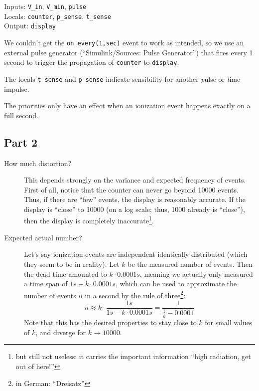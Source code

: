 \documentclass[a4paper,parskip,headheight=38pt]{scrartcl} %
\begin{document}
Inputs: \texttt{V\_in}, \texttt{V\_min}, \texttt{pulse} \\
Locals: \texttt{counter}, \texttt{p\_sense}, \texttt{t\_sense} \\
Output: \texttt{display}

We couldn't get the \texttt{on every(1,sec)} event to work as intended,
so we use an external pulse generator (\enquote{Simulink/Sources: Pulse
Generator}) that fires every 1 second to trigger the propagation of
\texttt{counter} to \texttt{display}.

The locals \texttt{t\_sense} and \texttt{p\_sense} indicate  sensibility for
another \emph{p}ulse or \emph{t}ime impulse.

The priorities only have an effect when an ionization event
happens exactly on a full second.

 \pagebreak{}
\subsection*{Part 2}

\begin{description}
    \item[How much distortion?] This depends strongly on the variance and
    expected frequency of events.  First of all, notice that the
    counter can never go beyond 10000 events.  Thus, if
    there are \enquote{few} events, the display is reasonably accurate.
    If the display is \enquote{close} to 10000 (on a log
    scale; thus, 1000 already is \enquote{close}), then the
    display is completely inaccurate\footnote{but still not useless: it
    carries the important information \enquote{high radiation, get out
    of here!}}.
    \item[Expected actual number?] Let's say ionization events are
    independent identically distributed (which they seem to be in
    reality).  Let $k$ be the measured number of events.  Then the dead
    time amounted to $k \cdot 0.0001 s$, meaning we actually only
    measured a time span of $1 s - k \cdot 0.0001 s$, which can be used
    to approximate the number of events $n$ in a second by the rule of
    three\footnote{in German: \enquote{Dreisatz}}:
        \[ n \approx k \cdot \frac{1 s}{1 s - k \cdot 0.0001 s}
             = \frac{1}{\frac{1}{k} - 0.0001}\]
    Note that this has the desired properties to stay close to $k$ for
    small values of $k$, and diverge for $k \to 10000$.
\end{description}
\end{document}

